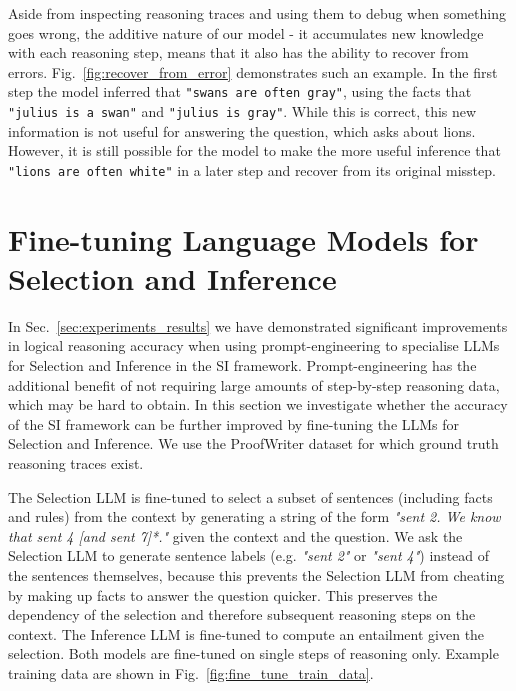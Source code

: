 Aside from inspecting reasoning traces and using them to debug when something goes wrong, the additive nature of our model - it accumulates new knowledge with each reasoning step, means that it also has the ability to recover from errors. Fig.~\ref{fig:recover_from_error} demonstrates such an example. In the first step the model inferred that \texttt{"swans are often gray"}, using the facts that \texttt{"julius is a swan"} and \texttt{"julius is gray"}. While this is correct, this new information is not useful for answering the question, which asks about lions. However, it is still possible for the model to make the more useful inference that \texttt{"lions are often white"} in a later step and recover from its original misstep.

\section{Fine-tuning Language Models for Selection and Inference} \label{sec:fine_tuning}
In Sec.~\ref{sec:experiments_results} we have demonstrated significant improvements in logical reasoning accuracy when using prompt-engineering to specialise LLMs for Selection and Inference in the SI framework. Prompt-engineering has the additional benefit of not requiring large amounts of step-by-step reasoning data, which may be hard to obtain. In this section we investigate whether the accuracy of the SI framework can be further improved by fine-tuning the LLMs for Selection and Inference. We use the ProofWriter dataset for which ground truth reasoning traces exist. 

The Selection LLM is fine-tuned to select a subset of sentences (including facts and rules) from the context by generating a string of the form \emph{"sent 2. We know that sent 4 [and sent 7]*."} given the context and the question. We ask the Selection LLM to generate sentence labels (e.g. \emph{"sent 2"} or \emph{"sent 4"}) instead of the sentences themselves, because this prevents the Selection LLM from cheating by making up facts to answer the question quicker. This preserves the dependency of the selection and therefore subsequent reasoning steps on the context. The Inference LLM is fine-tuned to compute an entailment given the selection. Both models are fine-tuned on single steps of reasoning only. Example training data are shown in Fig.~\ref{fig:fine_tune_train_data}. 


